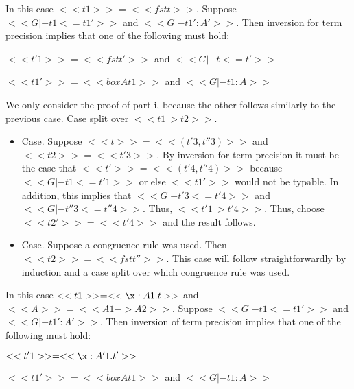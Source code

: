 \begin{description}
\item[] 
\item

  \noindent
  In this case $<<t1>> = <<fst t>>$.  Suppose $<<G |- t1 <= t1'>>$ and $<<G |- t1' : A'>>$.
  Then inversion for term precision implies that one of the following must hold:
  \begin{enumR}
  \item $<<t'1>> = <<fst t'>>$ and $<<G |- t <= t'>>$
  \item $<<t1'>> = <<box A t1>>$ and $<<G |- t1 : A>>$
  \end{enumR}

  We only consider the proof of part i, because the other follows similarly to
  the previous case. Case split over $<<t1 ~> t2>>$.
  \begin{itemize}
  \item[] Case. Suppose $<<t>> = <<(t'3,t''3)>>$ and $<<t2>> = <<t'3>>$.  By inversion for term precision it must be the case
    that $<<t'>> = <<(t'4,t''4)>>$ because $<<G |- t1 <= t'1>>$ or else $<<t1'>>$ would not be typable.  In addition,
    this implies that $<<G |- t'3 <= t'4>>$ and $<<G |- t''3 <= t''4>>$.
    Thus, $<<t'1 ~> t'4>>$. Thus, choose $<<t2'>> = <<t'4>>$ and the result follows.

  \item[] Case. Suppose a congruence rule was used.  Then $<<t2>> = <<fst t''>>$.
    This case will follow straightforwardly by induction and a case split over which congruence rule was used.
  \end{itemize}

\item[]
\item

  \noindent
  In this case $<<t1>> = <<\x:A1.t>>$ and $<<A>> = <<A1 -> A2>>$.
  Suppose $<<G |- t1 <= t1'>>$ and $<<G |- t1' : A'>>$.
  Then inversion of term precision implies that one of the following must hold:
  \begin{enumR}
  \item $<<t'1>> = <<\x:A'1.t'>>$
  \item $<<t1'>> = <<box A t1>>$ and $<<G |- t1 : A>>$
  \end{enumR}
  

\end{description}
